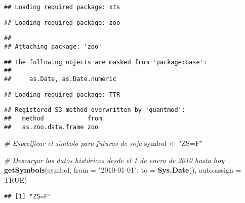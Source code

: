 \documentclass[
]{book}
\newenvironment{Shaded}{\begin{snugshade}}{\end{snugshade}}
\newcommand{\AttributeTok}[1]{\textcolor[rgb]{0.13,0.29,0.53}{#1}}
\newcommand{\CommentTok}[1]{\textcolor[rgb]{0.56,0.35,0.01}{\textit{#1}}}
\newcommand{\ConstantTok}[1]{\textcolor[rgb]{0.56,0.35,0.01}{#1}}
\newcommand{\FunctionTok}[1]{\textcolor[rgb]{0.13,0.29,0.53}{\textbf{#1}}}
\newcommand{\NormalTok}[1]{#1}
\newcommand{\OtherTok}[1]{\textcolor[rgb]{0.56,0.35,0.01}{#1}}
\newcommand{\StringTok}[1]{\textcolor[rgb]{0.31,0.60,0.02}{#1}}
\begin{document}
\begin{verbatim}
## Loading required package: xts
\end{verbatim}

\begin{verbatim}
## Loading required package: zoo
\end{verbatim}

\begin{verbatim}
## 
## Attaching package: 'zoo'
\end{verbatim}

\begin{verbatim}
## The following objects are masked from 'package:base':
## 
##     as.Date, as.Date.numeric
\end{verbatim}

\begin{verbatim}
## Loading required package: TTR
\end{verbatim}

\begin{verbatim}
## Registered S3 method overwritten by 'quantmod':
##   method            from
##   as.zoo.data.frame zoo
\end{verbatim}

\begin{Shaded}
\begin{Highlighting}[]
\CommentTok{\# Especificar el símbolo para futuros de soja}
\NormalTok{symbol }\OtherTok{\textless{}{-}} \StringTok{"ZS=F"}

\CommentTok{\# Descargar los datos históricos desde el 1 de enero de 2010 hasta hoy}
\FunctionTok{getSymbols}\NormalTok{(symbol, }\AttributeTok{from =} \StringTok{"2010{-}01{-}01"}\NormalTok{, }\AttributeTok{to =} \FunctionTok{Sys.Date}\NormalTok{(), }\AttributeTok{auto.assign =} \ConstantTok{TRUE}\NormalTok{)}
\end{Highlighting}
\end{Shaded}

\begin{verbatim}
## [1] "ZS=F"
\end{verbatim}
\end{document}
